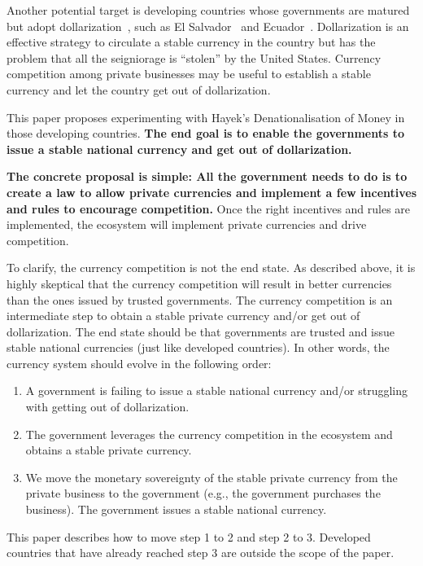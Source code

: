 \documentclass[dvipdfmx,a4paper]{article}
\begin{document}
Another potential target is developing countries whose governments are matured but adopt dollarization~\cite{quispe2006official,edwards2001dollarization}, such as El Salvador~\cite{alonso2023salvador,sohn2019economic,castillo2011macroeconomic,alvarez2023cryptocurrencies} and Ecuador~\cite{beckerman2002crisis,beckerman2001dollarization}. Dollarization is an effective strategy to circulate a stable currency in the country but has the problem that all the seigniorage is ``stolen'' by the United States. Currency competition among private businesses may be useful to establish a stable currency and let the country get out of dollarization.

This paper proposes experimenting with Hayek's Denationalisation of Money in those developing countries. \textbf{The end goal is to enable the governments to issue a stable national currency and get out of dollarization.}

\textbf{The concrete proposal is simple: All the government needs to do is to create a law to allow private currencies and implement a few incentives and rules to encourage competition.} Once the right incentives and rules are implemented, the ecosystem will implement private currencies and drive competition.

To clarify, the currency competition is not the end state. As described above, it is highly skeptical that the currency competition will result in better currencies than the ones issued by trusted governments. The currency competition is an intermediate step to obtain a stable private currency and/or get out of dollarization. The end state should be that governments are trusted and issue stable national currencies (just like developed countries). In other words, the currency system should evolve in the following order:

\begin{enumerate}
\item A government is failing to issue a stable national currency and/or struggling with getting out of dollarization.
\item The government leverages the currency competition in the ecosystem and obtains a stable private currency.
\item We move the monetary sovereignty of the stable private currency from the private business to the government (e.g., the government purchases the business). The government issues a stable national currency.
\end{enumerate}

This paper describes how to move step 1 to 2 and step 2 to 3. Developed countries that have already reached step 3 are outside the scope of the paper.
\end{document}
